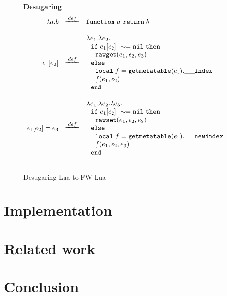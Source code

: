 \documentclass{article}
\begin{document}
\begin{figure}[P]
\caption{Desugaring Lua to FW Lua}
{\bf Desugaring}
\label{fig:FW2.1metamethods}
\[
\begin{array}{rclcl}

\desugar{
    \aFunction{a}{b}
}{
    {\tt function} ~a~ {\tt return} ~b~
}
\\
\desugar{
     e_1[e_2]
}{
    {\lambda}e_1.{\lambda}e_2.\\
    ~~{\tt if}~ e_1[e_2] ~\sim= {\tt nil} ~ {\tt then}\\
    ~~~~{\tt rawget}(e_1, e_2,e_3) ~\\
    ~~{\tt else}\\
    ~~~~{\tt local}~f = {\tt getmetatable}(e_1).{\tt{\_}{\_}index}~\\
    ~~~~f(e_1,e_2)\\ 
    ~~{\tt end}
}
\\
\desugar{
     e_1[e_2]=e_3
}{
    {\lambda}e_1.{\lambda}e_2.{\lambda}e_3.\\
    ~~{\tt if}~ e_1[e_2] ~\sim= {\tt nil} ~ {\tt then}\\
    ~~~~{\tt rawset}(e_1, e_2,e_3) ~\\
    ~~{\tt else}\\
    ~~~~{\tt local}~f = {\tt getmetatable}(e_1).{\tt{\_}{\_}newindex}~\\
    ~~~~f(e_1,e_2,e_3)\\ 
    ~~{\tt end}
}
\\


\end{array}
\]
\end{figure}
\section{Implementation}

\section{Related work}

\section{Conclusion}
\end{document}
